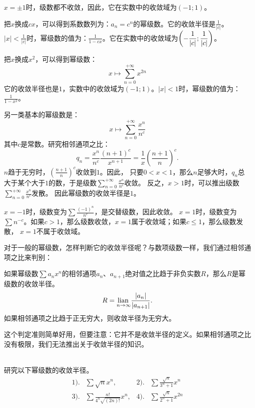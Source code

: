 \documentclass[12pt,UTF8]{ctexbook}
\begin{document}
$x = \pm 1$时，级数都不收敛，因此，它在实数中的收敛域为$(-1;1)$。

把$x$换成$cx$，可以得到系数数列为：$a_n = c^n$的幂级数。它的收敛半径是$\frac{1}{|c|}$。
$|x|<\frac{1}{|c|}$时，幂级数的值为：$\frac{1}{1 - cx}$。它在实数中的收敛域为$\displaystyle\left(-\frac{1}{|c|};\frac{1}{|c|}\right)$。

把$x$换成$x^2$，可以得到幂级数：
$$ x \mapsto \sum_{n=0}^{+\infty} x^{2n} $$
它的收敛半径也是$1$，实数中的收敛域为$(-1;1)$。$|x|<1$时，幂级数的值为：$\frac{1}{1 - x^2}$。

另一类基本的幂级数是：
$$ x \mapsto \sum_{n=0}^{+\infty} \frac{x^n}{n^c}$$
其中$c$是常数。研究相邻通项之比：
$$ q_n = \frac{x^n}{n^c} \frac{(n+1)^c}{x^{n+1}} = \frac{1}{x} \left(\frac{n+1}{n}\right)^c. $$
$n$趋于无穷时，$\displaystyle \left(\frac{n+1}{n}\right)^c$收敛到$1$。因此，
只要$0<x<1$，那么$n$足够大时，$q_n$总大于某个大于$1$的数，于是级数$\sum_{n=0}^{+\infty} \frac{x^n}{n^c}$收敛。
反之，$x>1$时，可以推出级数$\sum_{n=0}^{+\infty} \frac{x^n}{n^c}$发散。
因此幂级数的收敛半径是$1$。

$x=-1$时，级数变为$\sum \frac{(-1)^n}{n^c}$，是交替级数，因此收敛。
$x=1$时，级数变为$\sum n^{-c}$。如果$c>1$，那么级数收敛，$x=1$属于收敛域；如果$c\leqslant 1$，那么级数发散，
$x=1$不属于收敛域。

对于一般的幂级数，怎样判断它的收敛半径呢？与数项级数一样，我们通过相邻通项之比来判别：

\begin{tm}
    如果幂级数$\sum a_n x^n$的相邻通项$a_n$、$a_{n+1}$绝对值之比趋于非负实数$R$，那么$R$是幂级数的收敛半径。
    $$ R = \underset{n\to\infty}{\operatorname{lian}\,} \frac{|a_n|}{|a_{n+1}|}. $$
    如果相邻通项之比趋于正无穷大，则收敛半径为无穷大。
\end{tm}

这个判定准则简单好用，但要注意：它并不是收敛半径的定义。如果相邻通项之比没有极限，我们无法推出关于收敛半径的知识。

\begin{et}    
    \mbox{} \\
    研究以下幂级数的收敛半径。\\
    \begin{align*}
        1).& \sum \sqrt{n} x^n,  &2).& \sum \frac{\sqrt{n}}{3^n + 1} x^n \\
        3).& \sum \frac{n!}{4^n\sqrt{(2n)!}} x^n,  & 4).& \sum \frac{\sqrt{n}}{2^n+1} x^{2n} 
    \end{align*}
\end{et}
\end{document}
